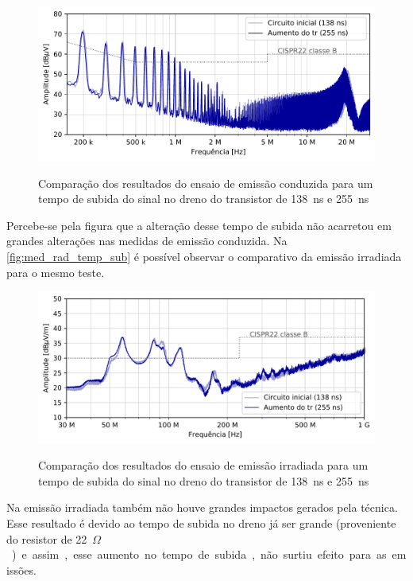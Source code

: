     \begin{figure}[H]
    	\centering 
    	\caption{Comparação dos resultados do ensaio de emissão conduzida para um tempo de subida do sinal no dreno do transistor de \qty{138}{\nano\second} e \qty{255}{\nano\second}}
    	\includegraphics[scale=.9]{pdf/cond/Aumento do tr do transistor2.pdf}
    	\label{fig:med_cond_temp_sub}
    \end{figure}
    
    Percebe-se pela figura que a alteração desse tempo de subida não acarretou em grandes alterações nas medidas de emissão conduzida. Na \autoref{fig:med_rad_temp_sub} é possível observar o comparativo da emissão irradiada para o mesmo teste.  
    
    \begin{figure}[H]
    	\centering
    	\caption{Comparação dos resultados do ensaio de emissão irradiada para um tempo de subida do sinal no dreno do transistor de \qty{138}{\nano\second} e \qty{255}{\nano\second}}
    	\includegraphics[scale=.9]{pdf/rad/Aumento do tr do transistor2.pdf}
    	\label{fig:med_rad_temp_sub}
    \end{figure}
    
    Na emissão irradiada também não houve grandes impactos gerados pela técnica. Esse resultado é devido ao tempo de subida no dreno já ser grande (proveniente do resistor de \qty{22}{$\Omega$}) e assim, esse aumento no tempo de subida, não surtiu efeito para as emissões. 
    
